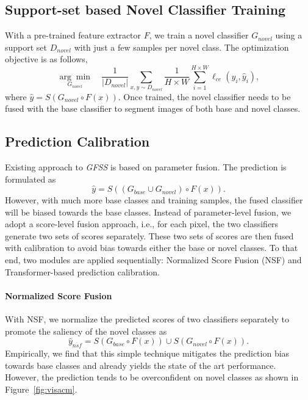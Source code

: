 \documentclass[journal]{IEEEtran}
\begin{document}
\subsection{Support-set based Novel Classifier Training}
With a pre-trained feature extractor $F$, we train a novel classifier $G_{novel}$ using a support set $D_{novel}$ with just a few samples per novel class. The optimization objective is as follows,
\begin{equation}
\underset{G_{novel}}{\arg\min}\quad \frac{1}{|D_{novel}|}\sum_{x, y\sim D_{novel}} \frac{1}{H\times W}\sum_{i=1}^{H\times W} \ell_{ce}(y_{i}, \hat{y}_i),
    \label{novel_clf}
\end{equation}
where $\hat{y}=S(G_{novel}\circ F(x))$.
Once trained, the novel classifier needs to be fused with the base classifier to segment images of both base and novel classes.

\subsection{Prediction Calibration}
\label{stage2}
Existing approach to \textit{GFSS} is based on parameter fusion. The prediction is formulated as
$$
\hat{y} = S((G_{base}\cup G_{novel}) \circ F(x)).
$$
However, with much more base classes and training samples, the fused classifier will be biased towards the base classes. Instead of parameter-level fusion, we adopt a score-level fusion approach, i.e., for each pixel, the two classifiers generate two sets of scores separately. These two sets of scores are then fused with calibration to avoid bias towards either the base or novel classes. To that end,  two modules are applied sequentially: Normalized Score Fusion (NSF) and Transformer-based prediction calibration.

\paragraph{Normalized Score Fusion} 
With NSF, we normalize the predicted scores of two classifiers separately to promote the saliency of the novel classes as 
\begin{equation}
\label{eq:nsf}
    \hat{y}_{nsf} = S(G_{base} \circ F(x)) \cup S(G_{novel} \circ F(x)).
\end{equation}
Empirically, we find that this simple technique mitigates the prediction bias towards base classes and already yields the state of the art performance. However, the prediction tends to be overconfident on novel classes as shown in  Figure~\ref{fig:visacm}.
\end{document}
